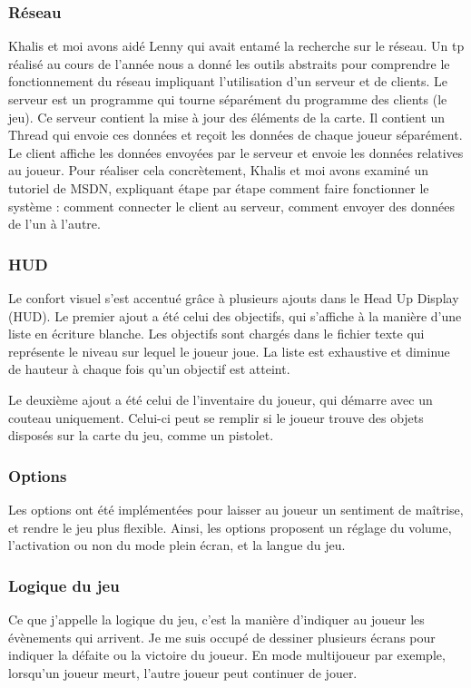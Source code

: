 \documentclass[12pt]{article}
\begin{document}
\subsubsection {Réseau}
Khalis et moi avons aidé Lenny qui avait entamé la recherche sur le réseau. Un tp réalisé au cours de l'année nous a donné les outils abstraits pour comprendre le fonctionnement du réseau impliquant l'utilisation d'un serveur et de clients. Le serveur est un programme qui tourne séparément du programme des clients (le jeu). Ce serveur contient la mise à jour des éléments de la carte. Il contient un Thread qui envoie ces données et reçoit les données de chaque joueur séparément. Le client affiche les données envoyées par le serveur et envoie les données relatives au joueur. Pour réaliser cela concrètement, Khalis et moi avons examiné un tutoriel de MSDN, expliquant étape par étape comment faire fonctionner le système : comment connecter le client au serveur, comment envoyer des données de l'un à l'autre.
\subsubsection {HUD} 
\par
Le confort visuel s'est accentué grâce à plusieurs ajouts dans le Head Up Display (HUD). Le premier ajout a été celui des objectifs, qui s'affiche à la manière d'une liste en écriture blanche. Les objectifs sont chargés dans le fichier texte qui représente le niveau sur lequel le joueur joue. La liste est exhaustive et diminue de hauteur à chaque fois qu'un objectif est atteint. 

\par
Le deuxième ajout a été celui de l'inventaire du joueur, qui démarre avec un couteau uniquement. Celui-ci peut se remplir si le joueur trouve des objets disposés sur la carte du jeu, comme un pistolet.

\subsubsection {Options} 
Les options ont été implémentées pour laisser au joueur un sentiment de maîtrise, et rendre le jeu plus flexible. Ainsi, les options proposent un réglage du volume, l'activation ou non du mode plein écran, et la langue du jeu.

\subsubsection {Logique du jeu} 
Ce que j'appelle la logique du jeu, c'est la manière d'indiquer au joueur les évènements qui arrivent. Je me suis occupé de dessiner plusieurs écrans pour indiquer la défaite ou la victoire du joueur. En mode multijoueur par exemple, lorsqu'un joueur meurt, l'autre joueur peut continuer de jouer.
\end{document}
